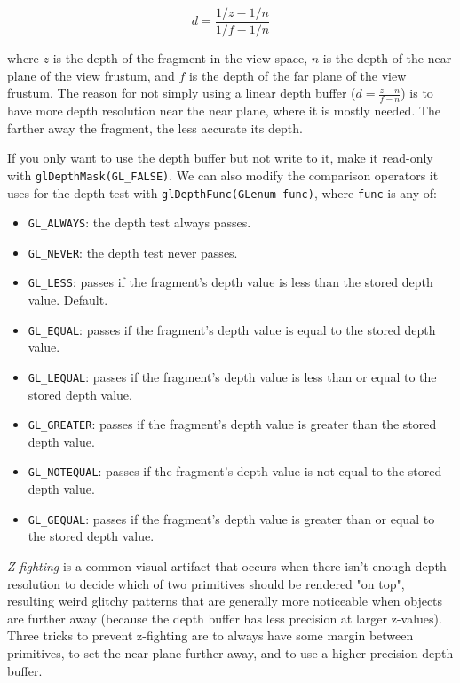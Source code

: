 \documentclass[table, xcdraw]{article}%
\begin{document}
\begin{equation}
    d = \frac{1/z - 1/n}{1/f - 1/n}
\end{equation}

where $z$ is the depth of the fragment in the view space, $n$ is the depth of the near plane of the view frustum, and $f$ is the depth of the far plane of the view frustum. The reason for not simply using a linear depth buffer ($d = \frac{z - n}{f - n}$) is to have more depth resolution near the near plane, where it is mostly needed. The farther away the fragment, the less accurate its depth.

If you only want to use the depth buffer but not write to it, make it read-only with \texttt{glDepthMask(GL_FALSE)}. We can also modify the comparison operators it uses for the depth test with \texttt{glDepthFunc(GLenum func)}, where \texttt{func} is any of:

\begin{itemize}
    \item \texttt{GL_ALWAYS}: the depth test always passes.
    \item \texttt{GL_NEVER}: the depth test never passes.
    \item \texttt{GL_LESS}: passes if the fragment's depth value is less than the stored depth value. Default.
    \item \texttt{GL_EQUAL}: passes if the fragment's depth value is equal to the stored depth value.
    \item \texttt{GL_LEQUAL}: passes if the fragment's depth value is less than or equal to the stored depth value.
    \item \texttt{GL_GREATER}: passes if the fragment's depth value is greater than the stored depth value.
    \item \texttt{GL_NOTEQUAL}: passes if the fragment's depth value is not equal to the stored depth value.
    \item \texttt{GL_GEQUAL}: passes if the fragment's depth value is greater than or equal to the stored depth value.
\end{itemize}

\emph{Z-fighting} is a common visual artifact that occurs when there isn't enough depth resolution to decide which of two primitives should be rendered "on top", resulting weird glitchy patterns that are generally more noticeable when objects are further away (because the depth buffer has less precision at larger z-values). Three tricks to prevent z-fighting are to always have some margin between primitives, to set the near plane further away, and to use a higher precision depth buffer.
\end{document}
